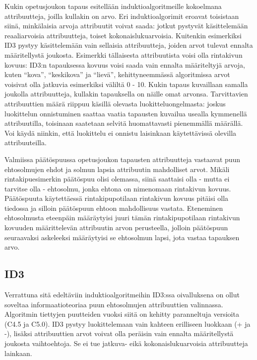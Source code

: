 \documentclass[12pt,finnish]{tktltiki2}
\theoremstyle{definition}
\theoremstyle{remark}
\begin{document}
Kukin opetusjoukon tapaus esitellään induktioalgoritmeille kokoelmana attribuutteja, joilla kullakin on arvo.
Eri induktioalgorimit eroavat toisistaan siinä, minkälaisia arvoja attribuutit voivat saada:
jotkut pystyvät käsittelemään reaaliarvoisia attribuutteja, toiset kokonaislukuarvoisia. Kuitenkin esimerkiksi
ID3 pystyy käsittelemään vain sellaisia attribuutteja, joiden arvot tulevat ennalta määritellystä
joukosta. Esimerkki tällaisesta attribuutista voisi olla rintakivun kovuus: ID3:n tapauksessa kovuus voisi
saada vain ennalta määriteltyjä arvoja, kuten ``kova'', ``keskikova'' ja ``lievä'', kehittyneemmässä
algoritmissa arvot voisivat olla jatkuvia esimerkiksi väliltä 0 - 10. Kukin tapaus kuvaillaan
samalla joukolla attribuutteja, kullakin tapauksella on näille omat arvonsa. Tarvittavien attribuuttien määrä
riippuu käsillä olevasta luokitteluongelmasta: joskus luokittelun onnistuminen saattaa vaatia
tapausten kuvailua usealla kymmenellä attribuutilla, toisinaan saatetaan selvitä huomattavasti pienemmällä
määrällä. Voi käydä niinkin, että luokittelu ei onnistu laisinkaan käytettävissä olevilla attribuuteilla.

Valmiissa päätöspuussa opetusjoukon tapausten attribuutteja vastaavat puun ehtosolmujen ehdot ja solmun lapsia
attribuutin mahdolliset arvot. Mikäli rintakipuesimerkin päätöspuu olisi olemassa, siinä saattaisi olla - mutta
ei tarvitse olla - ehtosolmu, jonka ehtona on nimenomaan rintakivun kovuus. Päätöspuuta käytettäessä
rintakipupotilaan rintakivun kovuus pitäisi olla tiedossa ja silloin päätöspuun ehtoon mahdollisuus vastata.
Eteneminen ehtosolmusta eteenpäin määräytyisi juuri tämän rintakipupotilaan rintakivun kovuuden määrittelevän
attribuutin arvon perusteella, jolloin päätöspuun seuraavaksi askeleeksi määräytyisi se ehtosolmun lapsi,
jota vastaa tapauksen arvo. 

\subsection{ID3}
\label{sec:ID3}
Verrattuna sitä edeltäviin induktioalgoritmeihin ID3:ssa oivalluksena on ollut soveltaa informaatioteoriaa
puun ehtosolmujen attribuuttien valinnassa. Algoritmin tiettyjen puutteiden vuoksi siitä on kehitty
paranneltuja versioita (C4.5 ja C5.0). ID3 pystyy luokittelemaan vain kahteen erilliseen luokkaan (+ ja -), lisäksi
attribuuttien arvot voivat olla peräisin vain ennalta määritellystä joukosta vaihtoehtoja. Se ei tue
jatkuva- eikä kokonaislukuarvoisia attribuutteja lainkaan.
\end{document}
